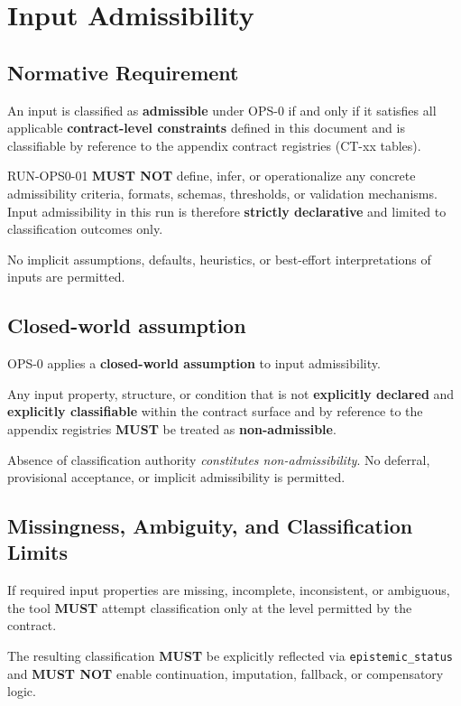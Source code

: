 ﻿\section{Input Admissibility}

\subsection{Normative Requirement}
An input is classified as \textbf{admissible} under OPS-0 if and only if it satisfies
all applicable \textbf{contract-level constraints} defined in this document
and is classifiable by reference to the appendix contract registries (CT-xx tables).

RUN-OPS0-01 \textbf{MUST NOT} define, infer, or operationalize any concrete admissibility criteria,
formats, schemas, thresholds, or validation mechanisms.
Input admissibility in this run is therefore \textbf{strictly declarative} and
limited to classification outcomes only.

No implicit assumptions, defaults, heuristics, or best-effort interpretations
of inputs are permitted.

\subsection{Closed-world assumption}
OPS-0 applies a \textbf{closed-world assumption} to input admissibility.

Any input property, structure, or condition
that is not \textbf{explicitly declared} and
\textbf{explicitly classifiable} within the contract surface
and by reference to the appendix registries
\textbf{MUST} be treated as \textbf{non-admissible}.

Absence of classification authority
\emph{constitutes non-admissibility}.
No deferral, provisional acceptance,
or implicit admissibility is permitted.

\subsection{Missingness, Ambiguity, and Classification Limits}
If required input properties are missing, incomplete, inconsistent, or ambiguous,
the tool \textbf{MUST} attempt classification only at the level permitted by the contract.

The resulting classification \textbf{MUST} be explicitly reflected via
\texttt{epistemic\_status} and \textbf{MUST NOT} enable continuation, imputation,
fallback, or compensatory logic.

